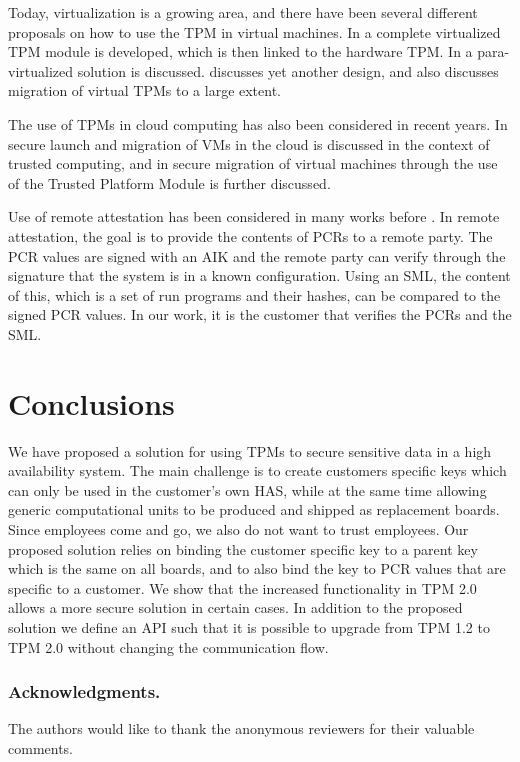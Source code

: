 {Today, virtualization is a growing area, and there have been several different proposals on how to use the TPM in virtual machines. In \cite{berger:2006} a complete virtualized TPM module is developed, which is then linked to the hardware TPM. In \cite{england:2008} a para-virtualized solution is discussed. \cite{sadeghi:2008} discusses yet another design, and also discusses migration of virtual TPMs to a large extent.

The use of TPMs in cloud computing has also been considered in recent years. In \cite{santos:2009} secure launch and migration of VMs in the cloud is discussed in the context of trusted computing, and in \cite{aslam:2012} secure migration of virtual machines through the use of the Trusted Platform Module is further discussed.

Use of remote attestation has been considered in many works before \cite{berger:2006,gu:2008,nauman:2010,sailer:2004}. In remote attestation, the goal is to provide the contents of PCRs to a remote party. The PCR values are signed with an AIK and the remote party can verify through the signature that the system is in a known configuration. Using an SML, the content of this, which is a set of run programs and their hashes, can be compared to the signed PCR values. In our work, it is the customer that verifies the PCRs and the SML.

\section{Conclusions} \label{sec:conc}
We have proposed a solution for using TPMs to secure sensitive data in a high availability system. The main challenge is to create customers specific keys which can only be used in the customer's own HAS, while at the same time allowing generic computational units to be produced and shipped as replacement boards. Since employees come and go, we also do not want to trust employees. Our proposed solution relies on binding the customer specific key to a parent key which is the same on all boards, and to also bind the key to PCR values that are specific to a customer. We show that the increased functionality in TPM 2.0 allows a more secure solution in certain cases. In addition to the proposed solution we define an API such that it is possible to upgrade from TPM 1.2 to TPM 2.0 without changing the communication flow.

\subsubsection{Acknowledgments.}The authors would like to thank the anonymous reviewers for their valuable comments.

{\raggedright
	\printbibliography[segment=\therefsegment,heading=subbibliography]
}

}